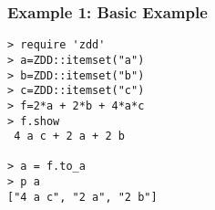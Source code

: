 \subsubsection*{Example 1: Basic Example}



\begin{Verbatim}[baselinestretch=0.7,frame=single]
> require 'zdd'
> a=ZDD::itemset("a")
> b=ZDD::itemset("b")
> c=ZDD::itemset("c")
> f=2*a + 2*b + 4*a*c
> f.show
 4 a c + 2 a + 2 b

> a = f.to_a
> p a
["4 a c", "2 a", "2 b"]
\end{Verbatim}
